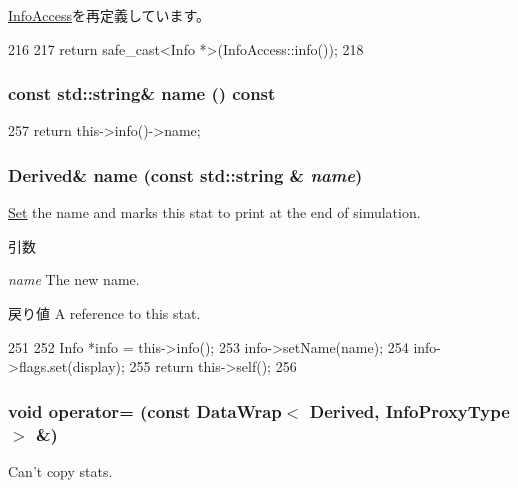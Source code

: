 \hyperlink{classStats_1_1InfoAccess_af42813244273f247e199283572cb5e9c}{InfoAccess}を再定義しています。


\begin{DoxyCode}
216     {
217         return safe_cast<Info *>(InfoAccess::info());
218     }
\end{DoxyCode}
\hypertarget{classStats_1_1DataWrap_a324e8c54c4c5161913681a1a52fef959}{
\subsubsection[{name}]{\setlength{\rightskip}{0pt plus 5cm}const std::string\& name () const}}
\label{classStats_1_1DataWrap_a324e8c54c4c5161913681a1a52fef959}



\begin{DoxyCode}
257 { return this->info()->name; }
\end{DoxyCode}
\hypertarget{classStats_1_1DataWrap_a8eaf5c2b92132dfcacd7d9b10afb1726}{
\subsubsection[{name}]{\setlength{\rightskip}{0pt plus 5cm}Derived\& name (const std::string \& {\em name})}}
\label{classStats_1_1DataWrap_a8eaf5c2b92132dfcacd7d9b10afb1726}
\hyperlink{classSet}{Set} the name and marks this stat to print at the end of simulation. 
\begin{DoxyParams}{引数}
\item[{\em name}]The new name. \end{DoxyParams}
\begin{DoxyReturn}{戻り値}
A reference to this stat. 
\end{DoxyReturn}



\begin{DoxyCode}
251     {
252         Info *info = this->info();
253         info->setName(name);
254         info->flags.set(display);
255         return this->self();
256     }
\end{DoxyCode}
\hypertarget{classStats_1_1DataWrap_abbb367287ae111264a1f2e657b5f8f36}{
\subsubsection[{operator=}]{\setlength{\rightskip}{0pt plus 5cm}void operator= (const {\bf DataWrap}$<$ Derived, InfoProxyType $>$ \&)}}
\label{classStats_1_1DataWrap_abbb367287ae111264a1f2e657b5f8f36}
Can't copy stats. 

